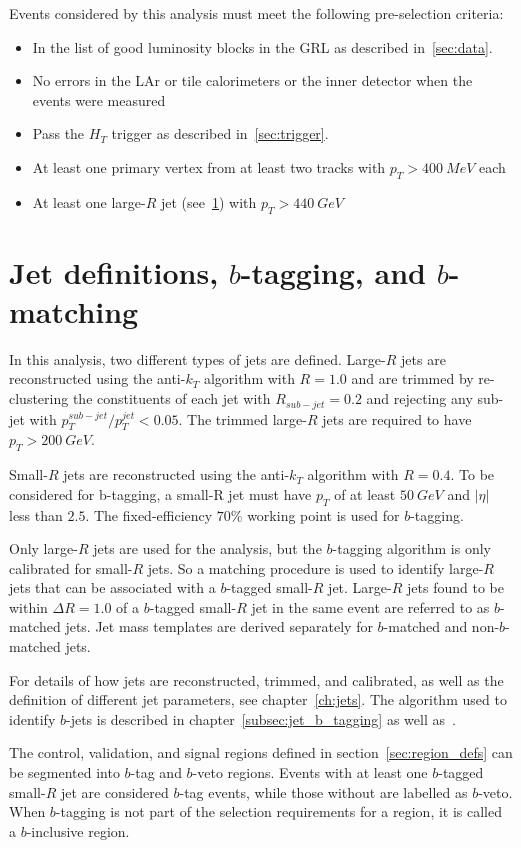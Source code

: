 Events considered by this analysis must meet the following pre-selection criteria:

\begin{itemize}
    \item In the list of good luminosity blocks in the GRL as described in~\ref{sec:data}.
    \item No errors in the LAr or tile calorimeters or the inner detector when the events were measured
    \item Pass the $H_{T}$ trigger as described in~\ref{sec:trigger}.
    \item At least one primary vertex from at least two tracks with $p_{T}>400~MeV$ each
    \item At least one large-$R$ jet (see~\ref{sec:jet_definitions}) with $p_{T}>440~GeV$
\end{itemize}

\section{Jet definitions, $b$-tagging, and $b$-matching}\label{sec:jet_definitions}

In this analysis, two different types of jets are defined.
Large-$R$ jets are reconstructed using the anti-$k_{T}$ algorithm with $R=1.0$ and are trimmed by re-clustering the constituents of each jet with $R_{sub-jet}=0.2$ and rejecting any sub-jet with $p_{T}^{sub-jet}/p_{T}^{jet}<0.05$.
The trimmed large-$R$ jets are required to have $p_{T}>200~GeV$.

Small-$R$ jets are reconstructed using the anti-$k_{T}$ algorithm with $R=0.4$.
To be considered for b-tagging, a small-R jet must have $p_{T}$ of at least $50~GeV$ and $|\eta|$ less than $2.5$.
The fixed-efficiency $70\%$ working point is used for $b$-tagging.

Only large-$R$ jets are used for the analysis, but the $b$-tagging algorithm is only calibrated for small-$R$ jets.
So a matching procedure is used to identify large-$R$ jets that can be associated with a $b$-tagged small-$R$ jet.
Large-$R$ jets found to be within $\Delta R=1.0$ of a $b$-tagged small-$R$ jet in the same event are referred to as $b$-matched jets.
Jet mass templates are derived separately for $b$-matched and non-$b$-matched jets.

For details of how jets are reconstructed, trimmed, and calibrated, as well as the definition of different jet parameters, see chapter~\ref{ch:jets}.
The algorithm used to identify $b$-jets is described in chapter~\ref{subsec:jet_b_tagging} as well as~\cite{b-jet-perf-1,b-jet-perf-2}.

The control, validation, and signal regions defined in section~\ref{sec:region_defs} can be segmented into $b$-tag and $b$-veto regions.
Events with at least one $b$-tagged small-$R$ jet are considered $b$-tag events, while those without are labelled as $b$-veto.
When $b$-tagging is not part of the selection requirements for a region, it is called a $b$-inclusive region.
